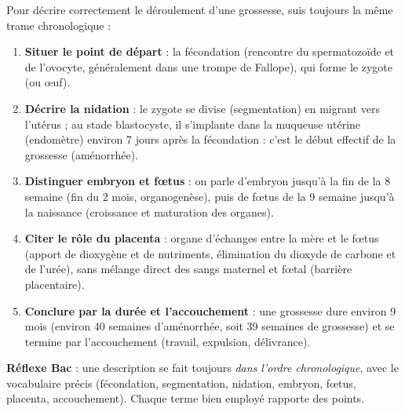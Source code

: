 \documentclass[11pt]{article}
\newcommand{\cle}[1]{{\popxbold\color{popdark}#1}}
\begin{document}
\begin{methode}
Pour décrire correctement le déroulement d'une grossesse, suis toujours la même trame chronologique :
\begin{enumerate}
\item \textbf{Situer le point de départ} : la fécondation (rencontre du spermatozoïde et de l'ovocyte, généralement dans une trompe de Fallope), qui forme le zygote (ou \oe uf).
\item \textbf{Décrire la nidation} : le zygote se divise (segmentation) en migrant vers l'utérus ; au stade blastocyste, il s'implante dans la muqueuse utérine (endomètre) environ 7 jours après la fécondation : c'est le début effectif de la grossesse (aménorrhée).
\item \textbf{Distinguer embryon et f\oe tus} : on parle d'\cle{embryon} jusqu'à la fin de la 8\ieme{} semaine (fin du 2\ieme{} mois, organogenèse), puis de \cle{f\oe tus} de la 9\ieme{} semaine jusqu'à la naissance (croissance et maturation des organes).
\item \textbf{Citer le rôle du placenta} : organe d'échanges entre la mère et le f\oe tus (apport de dioxygène et de nutriments, élimination du dioxyde de carbone et de l'urée), sans mélange direct des sangs maternel et f\oe tal (barrière placentaire).
\item \textbf{Conclure par la durée et l'accouchement} : une grossesse dure environ \cle{9 mois} (environ 40 semaines d'aménorrhée, soit 39 semaines de grossesse) et se termine par l'accouchement (travail, expulsion, délivrance).
\end{enumerate}
\textbf{Réflexe Bac} : une description se fait toujours \emph{dans l'ordre chronologique}, avec le vocabulaire précis (fécondation, segmentation, nidation, embryon, f\oe tus, placenta, accouchement). Chaque terme bien employé rapporte des points.
\end{methode}
\end{document}
